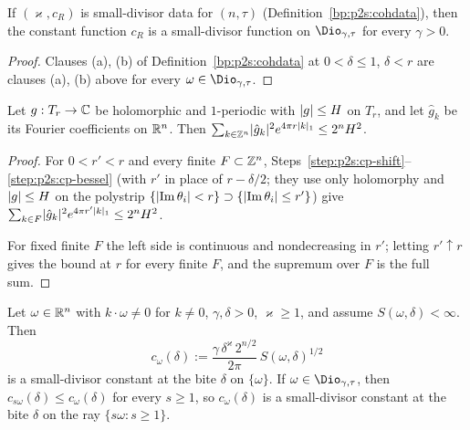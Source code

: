 \begin{lemma}\label{bp:p2s2sd:from-cohdata}
If $(\varkappa,c_R)$ is small-divisor data for $(n,\tau)$ (Definition~\ref{bp:p2s:cohdata}), then the constant function $c_R$ is a
small-divisor function on $\Dio_{\gamma,\tau}$ for every $\gamma>0$.
\end{lemma}

\begin{proof}
\label{step:p2s2sd:fc}
Clauses (a), (b) of Definition~\ref{bp:p2s:cohdata} at $0<\delta\le1$, $\delta<r$ are clauses (a), (b) above for every
$\omega\in\Dio_{\gamma,\tau}$.
\end{proof}

\begin{lemma}\label{bp:p2s2sd:bessel}
Let $g:T_r\to\mathbb{C}$ be holomorphic and $1$-periodic with $\lvert g\rvert\le H$ on $T_r$, and let $\hat g_k$ be its Fourier coefficients on
$\mathbb{R}^n$. Then $\sum_{k\in\mathbb{Z}^n}\lvert \hat g_k\rvert^2e^{4\pi r\lvert k\rvert_1}\le2^nH^2$.
\end{lemma}

\begin{proof}
\label{step:p2s2sd:bs-corner}
For $0<r'<r$ and every finite $F\subset\mathbb{Z}^n$, Steps~\ref{step:p2s:cp-shift}--\ref{step:p2s:cp-bessel} (with $r'$ in place of
$r-\delta/2$; they use only holomorphy and $\lvert g\rvert\le H$ on the polystrip $\{\lvert \operatorname{Im}\theta_i\rvert<r\}\supset\{\lvert \operatorname{Im}\theta_i\rvert\le r'\}$)
give $\sum_{k\in F}\lvert \hat g_k\rvert^2e^{4\pi r'\lvert k\rvert_1}\le2^nH^2$.

\label{step:p2s2sd:bs-limit}
For fixed finite $F$ the left side is continuous and nondecreasing in $r'$; letting $r'\uparrow r$ gives the bound at $r$ for every
finite $F$, and the supremum over $F$ is the full sum.
\end{proof}

\begin{lemma}\label{bp:p2s2sd:cs}
Let $\omega\in\mathbb{R}^n$ with $k\cdot\omega\ne0$ for $k\ne0$, $\gamma,\delta>0$, $\varkappa\ge1$, and assume $S(\omega,\delta)<\infty$. Then
\[
c_\omega(\delta):=\frac{\gamma\,\delta^\varkappa\,2^{n/2}}{2\pi}\,S(\omega,\delta)^{1/2}
\]
is a small-divisor constant at the bite $\delta$ on $\{\omega\}$. If $\omega\in\Dio_{\gamma,\tau}$, then $c_{s\omega}(\delta)\le c_\omega(\delta)$ for every
$s\ge1$, so $c_\omega(\delta)$ is a small-divisor constant at the bite $\delta$ on the ray $\{s\omega:s\ge1\}$.
\end{lemma}

